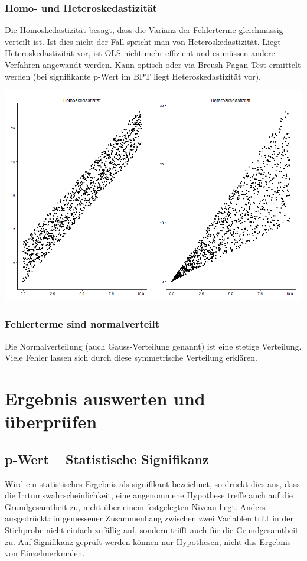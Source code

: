 \documentclass[10pt,a4paper]{article}
\begin{document}
        \subsubsection{Homo- und Heteroskedastizität}
        Die Homoskedastizität besagt, dass die Varianz der Fehlerterme gleichmässig verteilt ist. Ist dies nicht der Fall spricht man von Heteroskedastizität. Liegt Heteroskedastizität vor, ist OLS nicht mehr effizient und es müssen andere Verfahren angewandt werden. Kann optisch oder via Breush Pagan Test ermittelt werden (bei signifikante p-Wert im BPT liegt Heteroskedastizität vor).

        \includegraphics[max width=\textwidth]{../Plots/homo_heterosked.png}

        \subsubsection{Fehlerterme sind normalverteilt}
        Die Normalverteilung (auch Gauss-Verteilung genannt) ist eine stetige Verteilung. Viele Fehler lassen sich durch diese symmetrische Verteilung erklären.


\section{Ergebnis auswerten und überprüfen}
    \subsection{p-Wert -- Statistische Signifikanz}
    Wird ein statistisches Ergebnis als signifikant bezeichnet, so drückt dies aus, dass die Irrtumswahrscheinlichkeit, eine angenommene Hypothese treffe auch auf die Grundgesamtheit zu, nicht über einem festgelegten Niveau liegt. Anders ausgedrückt: in gemessener Zusammenhang zwischen zwei Variablen tritt in der Stichprobe nicht einfach zufällig auf, sondern trifft auch für die Grundgesamtheit zu. Auf Signifikanz geprüft werden können nur Hypothesen, nicht das Ergebnis von Einzelmerkmalen. 
\end{document}
